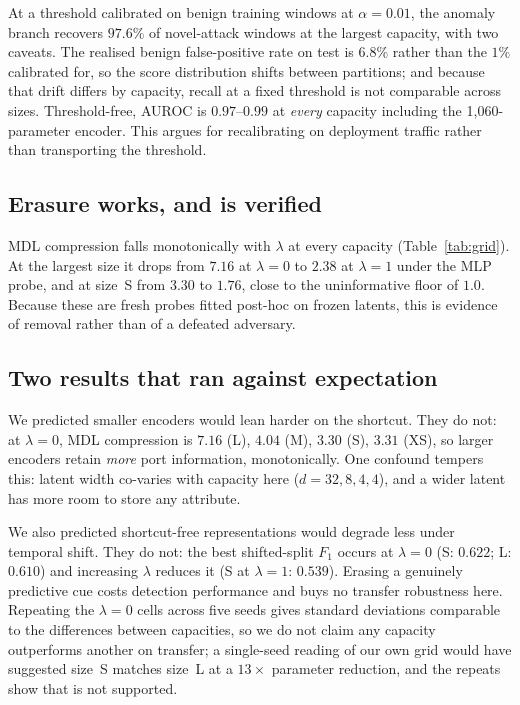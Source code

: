 \documentclass[conference]{IEEEtran}
\newcommand{\paramsXS}{1{,}060}
\begin{document}
At a threshold calibrated on benign training windows at $\alpha=0.01$, the anomaly branch
recovers $97.6\%$ of novel-attack windows at the largest capacity, with two caveats. The
realised benign false-positive rate on test is $6.8\%$ rather than the $1\%$ calibrated for,
so the score distribution shifts between partitions; and because that drift differs by
capacity, recall at a fixed threshold is not comparable across sizes. Threshold-free, AUROC
is $0.97$--$0.99$ at \emph{every} capacity including the \paramsXS-parameter encoder. This
argues for recalibrating on deployment traffic rather than transporting the threshold.

\subsection{Erasure works, and is verified}
MDL compression falls monotonically with $\lambda$ at every capacity
(Table~\ref{tab:grid}). At the largest size it drops from $7.16$ at $\lambda=0$ to $2.38$ at
$\lambda=1$ under the MLP probe, and at size~S from $3.30$ to $1.76$, close to the
uninformative floor of $1.0$. Because these are fresh probes fitted post-hoc on frozen
latents, this is evidence of removal rather than of a defeated adversary.

\subsection{Two results that ran against expectation}
We predicted smaller encoders would lean harder on the shortcut. They do not: at
$\lambda=0$, MDL compression is $7.16$ (L), $4.04$ (M), $3.30$ (S), $3.31$ (XS), so larger
encoders retain \emph{more} port information, monotonically. One confound tempers this:
latent width co-varies with capacity here ($d=32,8,4,4$), and a wider latent has more room
to store any attribute.

We also predicted shortcut-free representations would degrade less under temporal shift.
They do not: the best shifted-split $F_1$ occurs at $\lambda=0$ (S: $0.622$; L: $0.610$)
and increasing $\lambda$ reduces it (S at $\lambda=1$: $0.539$). Erasing a genuinely
predictive cue costs detection performance and buys no transfer robustness here. Repeating
the $\lambda=0$ cells across five seeds gives standard deviations comparable to the
differences between capacities, so we do not claim any capacity outperforms another on
transfer; a single-seed reading of our own grid would have suggested size~S matches size~L
at a $13\times$ parameter reduction, and the repeats show that is not supported.
\end{document}
